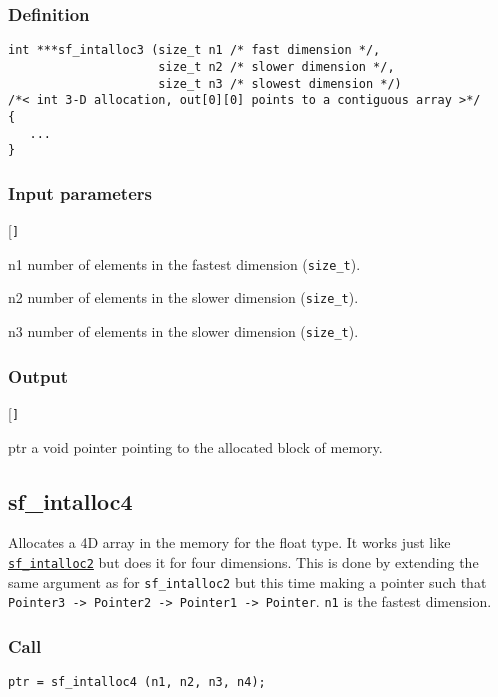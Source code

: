 \subsubsection*{Definition}
\begin{verbatim}
int ***sf_intalloc3 (size_t n1 /* fast dimension */, 
                     size_t n2 /* slower dimension */, 
                     size_t n3 /* slowest dimension */)
/*< int 3-D allocation, out[0][0] points to a contiguous array >*/ 
{
   ...
}
\end{verbatim}

\subsubsection*{Input parameters}
\begin{desclist}{\tt }{\quad}[\tt ]
   \setlength\itemsep{0pt}
   \item[n1] number of elements in the fastest dimension (\texttt{size\_t}).
   \item[n2] number of elements in the slower dimension (\texttt{size\_t}).
   \item[n3] number of elements in the slower dimension (\texttt{size\_t}).
\end{desclist}

\subsubsection*{Output}
\begin{desclist}{\tt }{\quad}[\tt ]
   \setlength\itemsep{0pt}
   \item[ptr] a void pointer pointing to the allocated block of memory.
\end{desclist}




\subsection{{sf\_intalloc4}}
Allocates a 4D array in the memory for the float type. It works just like \hyperref[sec:sf_intalloc2]{\texttt{sf\_intalloc2}} but does it for four dimensions. This is done by extending the same argument as for \texttt{sf\_intalloc2} but this time making a pointer such that \texttt{Pointer3 -> Pointer2 -> Pointer1 -> Pointer}. \texttt{n1} is the fastest dimension.

\subsubsection*{Call}
\begin{verbatim}ptr = sf_intalloc4 (n1, n2, n3, n4);\end{verbatim}

